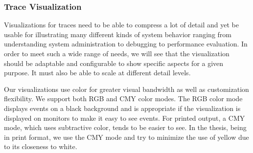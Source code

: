
\subsubsection{Trace Visualization}
\label{sec:lviz-vis}

Visualizations for traces need to be able to compress a lot of detail
and yet be usable for illustrating many different
kinds of system behavior ranging from understanding
system administration to debugging to performance evaluation.
In order to meet such a wide range of needs, we will see that the visualization
should be adaptable and configurable to show specific aspects for a
given purpose.  It must also be able to scale at different detail levels.


Our visualizations use color for greater visual
bandwidth as well as customization flexibility. 
We support both RGB and CMY color modes.
The RGB color mode displays events on a black background
and is appropriate if the visualization is displayed on monitors to 
make it easy to see events.
For printed output, a CMY mode, which uses subtractive color,
tends to be easier to see.
In the thesis, being in print format, we use the CMY mode
and try to minimize the use of yellow due to its closeness to white.



